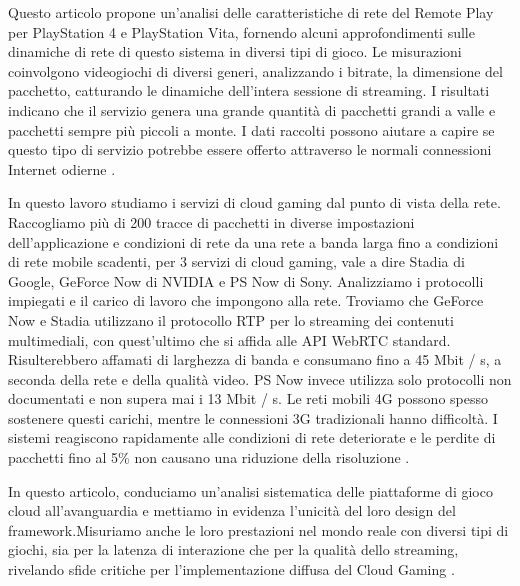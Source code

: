 Questo articolo propone un'analisi delle caratteristiche di rete del Remote Play per PlayStation 4 e PlayStation Vita, fornendo alcuni approfondimenti sulle dinamiche di rete di questo sistema in diversi tipi di gioco. Le misurazioni coinvolgono videogiochi di diversi generi, analizzando i bitrate, la dimensione del pacchetto, catturando le dinamiche dell'intera sessione di streaming. I risultati indicano che il servizio genera una grande quantità di pacchetti grandi a valle e pacchetti sempre più piccoli a monte. I dati raccolti possono aiutare a capire se questo tipo di servizio potrebbe essere offerto attraverso le normali connessioni Internet odierne \parencite{Network_Analysis_of_the_Sony_Remote_Play_System}.

In questo lavoro studiamo i servizi di cloud gaming dal punto di vista della rete. Raccogliamo più di 200 tracce di pacchetti in diverse impostazioni dell'applicazione e condizioni di rete da una rete a banda larga fino a condizioni di rete mobile scadenti, per 3 servizi di cloud gaming, vale a dire Stadia di Google, GeForce Now di NVIDIA e PS Now di Sony. Analizziamo i protocolli impiegati e il carico di lavoro che impongono alla rete. Troviamo che GeForce Now e Stadia utilizzano il protocollo RTP per lo streaming dei contenuti multimediali, con quest'ultimo che si affida alle API WebRTC standard. Risulterebbero affamati di larghezza di banda e consumano fino a 45 Mbit / s, a seconda della rete e della qualità video. PS Now invece utilizza solo protocolli non documentati e non supera mai i 13 Mbit / s. Le reti mobili 4G possono spesso sostenere questi carichi, mentre le connessioni 3G tradizionali hanno difficoltà. I sistemi reagiscono rapidamente alle condizioni di rete deteriorate e le perdite di pacchetti fino al 5\% non causano una riduzione della risoluzione \parencite{A_Network_Analysis_on_Cloud_Gaming_Stadia_GeForce_Now_and_PSNow}.

In questo articolo, conduciamo un'analisi sistematica delle piattaforme di gioco cloud all'avanguardia e mettiamo in evidenza l'unicità del loro design del framework.Misuriamo anche le loro prestazioni nel mondo reale con diversi tipi di giochi, sia per la latenza di interazione che per la qualità dello streaming, rivelando sfide critiche per l'implementazione diffusa del Cloud Gaming \parencite{Cloud_Gaming_Architecture_and_Performance}.


